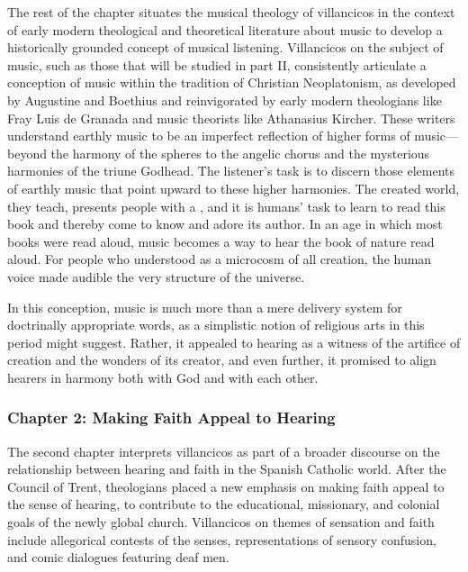 \documentclass{vcbook-proposal}
\begin{document}
The rest of the chapter situates the musical theology of villancicos in the
context of early modern theological and theoretical literature about music to
develop a historically grounded concept of musical listening.
Villancicos on the subject of music, such as those that will be studied in part
II, consistently articulate a conception of music within the tradition of
Christian Neoplatonism, as developed by Augustine and Boethius and reinvigorated
by early modern theologians like Fray Luis de Granada and music theorists like
Athanasius Kircher.%
    \Autocites{LuisdeGranada:Simbolo}{Kircher:Musurgia}
These writers understand earthly music to be an imperfect reflection of higher 
forms of music---beyond the harmony of the spheres to the angelic chorus and 
the mysterious harmonies of the triune Godhead. 
The listener's task is to discern those elements of earthly music that point 
upward to these higher harmonies.
The created world, they teach, presents people with a , and it is humans' task to learn to read this book and thereby come to 
know and adore its author.
In an age in which most books were read aloud, music becomes a way to hear the
book of nature read aloud.  
For people who understood  as a microcosm of all creation, the 
human voice made audible the very structure of the universe.

In this conception, music is much more than a mere delivery system for 
doctrinally appropriate words, as a simplistic notion of religious arts in this 
period might suggest.
Rather, it appealed to hearing as a witness of the artifice of creation and 
the wonders of its creator, and even further, it promised to align hearers in 
harmony both with God and with each other.

\subsubsection{Chapter 2: Making Faith Appeal to Hearing}

The second chapter interprets villancicos as part of a broader discourse on the 
relationship between hearing and faith in the Spanish Catholic world.
After the Council of Trent, theologians placed a new emphasis on making faith 
appeal to the sense of hearing, to contribute to the educational, missionary, 
and colonial goals of the newly global church.
Villancicos on themes of sensation and faith include allegorical contests of 
the senses, representations of sensory confusion, and comic dialogues featuring 
deaf men.
\end{document}
